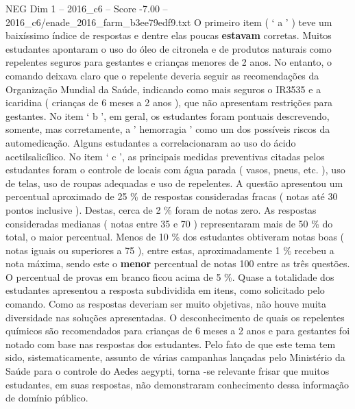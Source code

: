 \begin{textsample}{NEG Dim 1 – 2016\_c6 – Score -7.00 – 2016\_c6/enade\_2016\_farm\_b3ee79edf9.txt}
O primeiro item ( ‘ a ’ ) teve um baixíssimo índice de respostas e dentre elas poucas \textbf{estavam} corretas.
Muitos estudantes apontaram o uso do óleo de citronela e de produtos naturais como repelentes seguros para gestantes e crianças menores de 2 anos.
No entanto, o comando deixava claro que o repelente deveria seguir as recomendações da Organização Mundial da Saúde, indicando como mais seguros o IR3535 e a icaridina ( crianças de 6 meses a 2 anos ), que não apresentam restrições para gestantes.
No item ‘ b ’, em geral, os estudantes foram pontuais descrevendo, somente, mas corretamente, a ' hemorragia ' como um dos possíveis riscos da automedicação.
Alguns estudantes a correlacionaram ao uso do ácido acetilsalicílico.
No item ‘ c ’, as principais medidas preventivas citadas pelos estudantes foram o controle de locais com água parada ( vasos, pneus, etc. ), uso de telas, uso de roupas adequadas e uso de repelentes.
A questão apresentou um percentual aproximado de 25 \% de respostas consideradas fracas ( notas até 30 pontos inclusive ).
Destas, cerca de 2 \% foram de notas zero.
As respostas consideradas medianas ( notas entre 35 e 70 ) representaram mais de 50 \% do total, o maior percentual.
Menos de 10 \% dos estudantes obtiveram notas boas ( notas iguais ou superiores a 75 ), entre estas, aproximadamente 1 \% recebeu a nota máxima, sendo este o \textbf{menor} percentual de notas 100 entre as três questões.
O percentual de provas em branco ficou acima de 5 \%.
Quase a totalidade dos estudantes apresentou a resposta subdividida em itens, como solicitado pelo comando.
Como as respostas deveriam ser muito objetivas, não houve muita diversidade nas soluções apresentadas.
O desconhecimento de quais os repelentes químicos são recomendados para crianças de 6 meses a 2 anos e para gestantes foi notado com base nas respostas dos estudantes.
Pelo fato de que este tema tem sido, sistematicamente, assunto de várias campanhas lançadas pelo Ministério da Saúde para o controle do Aedes aegypti, torna -se relevante frisar que muitos estudantes, em suas respostas, não demonstraram conhecimento dessa informação de domínio público.

\end{textsample}
